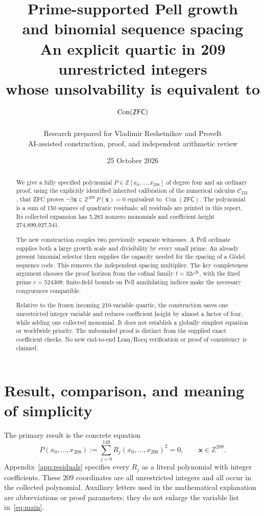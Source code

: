 \documentclass[11pt]{article}
\title{Prime-supported Pell growth\\and binomial sequence spacing\\[0.4em]\large An explicit quartic in 209 unrestricted integers\\whose unsolvability is equivalent to $\Con(\ZFC)$}
\author{Research prepared for Vladimir Reshetnikov and ProveIt\\\small AI-assisted construction, proof, and independent arithmetic review}
\date{25 October 2026}
\theoremstyle{definition}
\theoremstyle{remark}
\newcommand{\Z}{\mathbb Z}
\newcommand{\ZFC}{\mathsf{ZFC}}
\newcommand{\Con}{\operatorname{Con}}
\newcommand{\Ccal}{\mathcal C_{222}}
\begin{document}
\maketitle
\thispagestyle{empty}
\begin{abstract}
We give a fully specified polynomial $P\in\Z[x_0,\ldots,x_{208}]$ of
degree four and an ordinary proof, using the explicitly identified inherited
calibration of the numerical calculus $\Ccal$, that ZFC proves
$\neg\exists\boldsymbol x\in\Z^{209}\,P(\boldsymbol x)=0$
equivalent to $\Con(\ZFC)$. The polynomial is a sum of 150 squares of
quadratic residuals; all residuals are printed in this report. Its collected
expansion has 5,283 nonzero monomials and coefficient height
274,899,927,541.

The new construction couples two previously separate witnesses. A Pell
ordinate supplies both a large growth scale and divisibility by every small
prime. An already present binomial selector then supplies the capacity needed
for the spacing of a G\"odel sequence code. This removes the independent
spacing multiplier. The key completeness argument chooses the proof horizon
from the cofinal family $t=32c^{2k}$, with the fixed prime $c=524309$;
finite-field bounds on Pell annihilating indices make the necessary
congruences compatible.

Relative to the frozen incoming 210-variable quartic, the construction saves
one unrestricted integer variable and reduces coefficient height by almost
a factor of four, while adding one collected monomial. It does not establish
a globally simplest equation or worldwide priority. The unbounded proof is
distinct from the supplied exact coefficient checks. No new end-to-end
Lean/Rocq verification or proof of consistency is claimed.
\end{abstract}
\clearpage
\tableofcontents
\clearpage

\section{Result, comparison, and meaning of simplicity}

The primary result is the concrete equation
\begin{equation}\label{eq:main}
 \boxed{\quad P(x_0,\ldots,x_{208})
       :=\sum_{j=0}^{149}R_j(x_0,\ldots,x_{208})^2=0,
       \qquad \boldsymbol x\in\Z^{209}.\quad}
\end{equation}
Appendix~\ref{app:residuals} specifies every $R_j$ as a literal polynomial
with integer coefficients. These 209 coordinates are all unrestricted
integers and all occur in the collected polynomial. Auxiliary letters used
in the mathematical explanation are abbreviations or proof parameters;
they do not enlarge the variable list in~\eqref{eq:main}.
\end{document}
